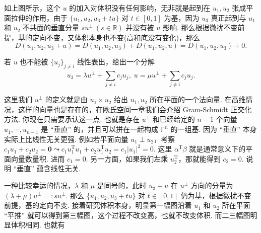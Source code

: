 \documentclass[10pt,openany]{article}
\theoremstyle{thmstyle} %
\theoremstyle{defstyle} %
\theoremstyle{prostyle} %
\theoremstyle{exastyle}
\theoremstyle{remstyle}
\newcommand{\T}{^{\text{T}}}
\newcommand{\F}{\mathbb{F}}
\begin{document}
\begin{enumerate}[(i)]
\begin{figure}[htbp!]
\begin{minipage}{0.3\linewidth}
		\end{minipage}
	\end{figure}
	
	\vspace{2ex}
	
	如上图所示，这个 \( u \) 的加入对体积没有任何影响，无非就是起到在 \( u_1,u_2 \) 张成平面拉伸的作用，由于 \( \{ u_1,u_2,u_3+tu\} \) 对 \( t \in [0,1] \) 为基，因为 \( u_3 \) 真正起到与 \( u_1 \) 和 \( u_2 \) 不共面的垂直分量 \( su^{\perp} \ (s \in \mathbb{R}) \) 并没有被 \( u \) 影响. 那么根据微扰不变前提，基的定向不变，又体积本身也不变(高和底没有变化)，那么
	\[ D(u_1,u_2,u_3+u)=D(u_1,u_2,u_3)+D(u_1,u_2,u)=D(u_1,u_2,u_3)+0. \]
	
	若 \( u \) 也不能被 \( \{u_j\}_{j \neq i} \) 线性表出，给出一个分解
	\[ u_3=\lambda u^{\perp}+ \sum_{j \neq i}^{} c_ju_j, \; u=\mu u^{\perp}+ \sum_{j \neq i}^{} c_ju_j. \]

	这里我们 \( u^{\perp} \) 的定义就是由 \( u_1 \times u_2 \) 给出 \( u_1, u_2 \) 所在平面的一个法向量. 在高维情况，这样的向量也是存在的，在欧氏空间一章我们会介绍 Gram-Schmidt 正交化方法. 你现在只需要承认这一点. 也就是存在 \( u^{\perp} \) 和已经给定的 \( n-1 \) 个向量 \( u_1,\cdots,u_{n-1} \) 是 “垂直” 的，并且可以拼在一起构成 \( \F^n \) 的一组基. 因为 “垂直” 本身实际上比线性无关更强. 例如若平面向量 \( u_1 \perp u_2 \)，考察 \( c_1u_1+c_2u_2=\bm{0} \leadsto c_1u_1\T u_1+c_2 u_1\T u_2= c_1 |u_1|^2= 0 \). 这里 \( \alpha\T \beta \) 就是通常意义下的平面向量数量积. 进而 \( c_1=0 \). 另一方面，如果我们左乘 \( u_2\T \)，那就能得到 \( c_2=0 \). 说明 “垂直” 蕴含线性无关.
	
	
	一种比较幸运的情况，\( \lambda \) 和 \( \mu \) 是同号的，此时 \( u_3+u \) 在 \( u^{\perp} \) 方向的分量为 \( (\lambda+\mu) u^{\perp}=:su^{\perp} \). 那么 \( \{ u_1,u_2,u_3+tu\} \) 对 \( t \in [0,1] \) 仍为基，根据微扰不变前提，基的定向不变. 接着研究体积本身，明显第一幅图沿着 \( u_1 \) 和 \( u_2 \) 所在平面 “平推” 就可以得到第三幅图，这个过程不改变高，也就不改变体积. 而二三幅图明显体积相同. 也就有
	

\end{enumerate}
\end{document}
